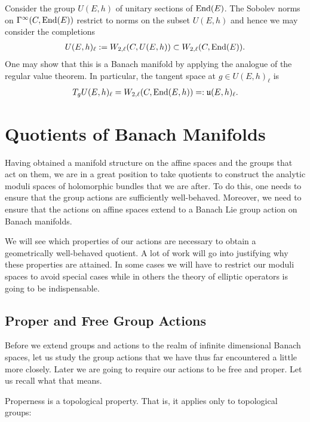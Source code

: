 \documentclass[12pt]{ociamthesis}  %
\begin{document}
\begin{example}
  Consider the group $U(E,h)$ of unitary
  sections of $\operatorname{End}(E)$. The Sobolev norms on $\Gamma^\infty(C,\operatorname{End}(E))$
  restrict to norms on the subset $U(E,h)$ and hence we
  may consider the completions
  \begin{align*}
    U(E,h)_\ell := W_{2,\ell}(C,U(E,h)) \subset W_{2,\ell}(C,\operatorname{End}(E)).
  \end{align*}
  One may show that this is a Banach manifold by applying the
  analogue of the regular value theorem. In particular,
  the tangent space at $g\in U(E,h)_\ell$ is
  \begin{align*}
    T_g U(E,h)_\ell = W_{2,\ell}(C,\operatorname{End}(E,h)) =: \mathfrak u(E,h)_\ell.
  \end{align*}
\end{example}

\section{Quotients of Banach Manifolds}

Having obtained a manifold structure on the affine spaces and the groups
that act on them, we are in a great position to take quotients to construct
the analytic moduli spaces of holomorphic bundles that we are after. To do this,
one needs to ensure that the group actions are sufficiently well-behaved. Moreover,
we need to ensure that the actions on affine spaces extend to a Banach Lie group
action on Banach manifolds.

We will see which properties of our actions are necessary to
obtain a geometrically well-behaved quotient. A lot of work will go into justifying why
these properties are attained. In some cases we will have to
restrict our moduli spaces to avoid special cases while in others
the theory of elliptic operators is going to be indispensable.

\subsection{Proper and Free Group Actions}

Before we extend groups and actions to the realm of infinite dimensional
Banach spaces, let us study the group actions that we have thus
far encountered a little more closely. Later we are going to require our
actions to be free and proper. Let us recall what that means.

Properness is a topological property. That is, it applies only to
topological groups:
\end{document}

